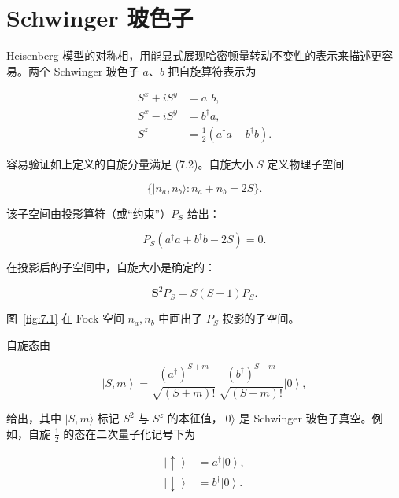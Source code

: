 \section{Schwinger 玻色子}

Heisenberg 模型的对称相，用能显式展现哈密顿量转动不变性的表示来描述更容易。两个 Schwinger 玻色子 $a$、$b$ 把自旋算符表示为

\begin{align*}
S ^ {x} + i S ^ {y} & = a ^ {\dagger} b ,\\
S ^ {x} - i S ^ {y} & = b ^ {\dagger} a ,\\
S ^ {z} & = \frac {1}{2} \left( a ^ {\dagger} a - b ^ {\dagger} b \right) .
\tag{7.5}
\end{align*}

容易验证如上定义的自旋分量满足 (7.2)。自旋大小 $S$ 定义物理子空间

\begin{equation*}
\{ | n _ {a}, n _ {b} \rangle : n _ {a} + n _ {b} = 2 S \}.
\tag{7.6}
\end{equation*}

该子空间由投影算符（或“约束”）$P_{S}$ 给出：

\begin{equation*}
P _ {S} \left( a ^ {\dagger} a + b ^ {\dagger} b - 2 S \right) = 0.
\tag{7.7}
\end{equation*}

在投影后的子空间中，自旋大小是确定的：

\begin{equation*}
\mathbf {S} ^ {2} P _ {S} = S ( S + 1 ) P _ {S}.
\tag{7.8}
\end{equation*}

图~\ref{fig:7.1} 在 Fock 空间 $n_a, n_b$ 中画出了 $P_S$ 投影的子空间。

自旋态由

\begin{equation*}
\left| S, m \right\rangle = \frac {\left( a ^ {\dagger} \right) ^ {S + m}}{\sqrt {( S + m ) !}} \, \frac {\left( b ^ {\dagger} \right) ^ {S - m}}{\sqrt {( S - m ) !}} \left| 0 \right\rangle ,
\tag{7.9}
\end{equation*}

给出，其中 $|S,m\rangle$ 标记 $S^{2}$ 与 $S^{z}$ 的本征值，$|0\rangle$ 是 Schwinger 玻色子真空。例如，自旋 $\frac{1}{2}$ 的态在二次量子化记号下为

\begin{align*}
\left| \uparrow \right\rangle & = a ^ {\dagger} \left| 0 \right\rangle ,\\
\left| \downarrow \right\rangle & = b ^ {\dagger} \left| 0 \right\rangle .
\tag{7.10}
\end{align*}

